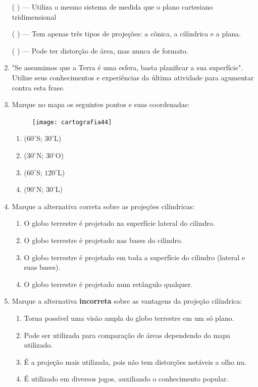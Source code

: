 \begin{enumerate}
({ }{ }{ }) --- Utiliza o mesmo sistema de medida que o plano cartesiano tridimensional

({ }{ }{ }) --- Tem apenas três tipos de projeções: a cônica, a cilíndrica e a plana.

({ }{ }{ }) --- Pode ter distorção de área, mas nunca de formato.

\item "Se assumimos que a Terra é uma esfera, basta planificar a sua superfície". Utilize seus conhecimentos e experiências da última atividade para agumentar contra esta frase.

\item Marque no mapa os seguintes pontos e suas coordenadas:

\begin{figure}[H]
\centering
\texttt{[image: cartografia44]}

\end{figure}

\begin{enumerate}
\item ($60^{\circ}$S; $30^{\circ}$L)
\item ($30^{\circ}$N; $30^{\circ}$O)
\item ($60^{\circ}$S; $120^{\circ}$L)
\item ($90^{\circ}$N; $30^{\circ}$L)
\end{enumerate}

\item Marque a alternativa correta sobre as projeções cilíndricas:
\begin{enumerate}
\item O globo terrestre é projetado na superfície lateral do cilindro.
\item O globo terrestre é projetado nas bases do cilindro.
\item O globo terrestre é projetado em toda a  superfície do cilindro (lateral e suas bases).
\item O globo terrestre é projetado num retângulo qualquer.
\end{enumerate}


\item Marque a alternativa \textbf{incorreta} sobre as vantagens da projeção cilíndrica:
\begin{enumerate}
\item Torna possível uma visão ampla do globo terrestre em um só plano.
\item Pode ser utilizada para comparação de áreas dependendo do mapa utilizado.
\item É a projeção mais utilizada, pois não tem distorções notáveis a olho nu.
\item É utilizado em diversos jogos, auxiliando o conhecimento popular.
\end{enumerate}


\end{enumerate}
